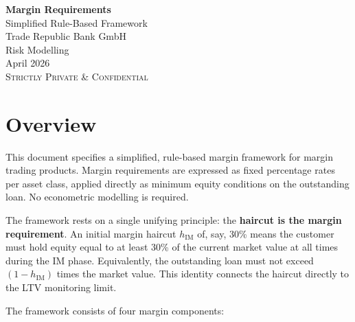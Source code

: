 \documentclass[9pt, a4paper]{extarticle}
\begin{document}
\begin{titlepage}
\vspace*{4cm}
\begin{center}
    {\Huge\bfseries Margin Requirements}\\[0.5em]
    {\Large Simplified Rule-Based Framework}\\[2em]
    {\large Trade Republic Bank GmbH}\\[0.5em]
    {\large Risk Modelling}\\[2em]
    {\normalsize April 2026}\\[1em]
    {\small\textsc{Strictly Private \& Confidential}}
\end{center}
\end{titlepage}

\tableofcontents
\newpage

\section{Overview}
\label{sec:overview}

This document specifies a simplified, rule-based margin framework for margin trading
products. Margin requirements are expressed as fixed percentage rates per asset class,
applied directly as minimum equity conditions on the outstanding loan. No econometric
modelling is required.

The framework rests on a single unifying principle: the \textbf{haircut is the margin
requirement}. An initial margin haircut $h_{\mathrm{IM}}$ of, say, 30\% means the
customer must hold equity equal to at least 30\% of the current market value at all
times during the IM phase. Equivalently, the outstanding loan must not exceed
$(1 - h_{\mathrm{IM}})$ times the market value. This identity connects the haircut
directly to the LTV monitoring limit.

The framework consists of four margin components:
\end{document}
